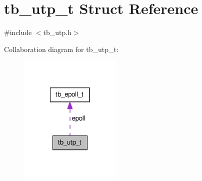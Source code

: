 \hypertarget{structtb__utp__t}{\section{tb\-\_\-utp\-\_\-t Struct Reference}
\label{structtb__utp__t}
}


{\ttfamily \#include $<$tb\-\_\-utp.\-h$>$}



Collaboration diagram for tb\-\_\-utp\-\_\-t\-:\nopagebreak
\begin{figure}[H]
\begin{center}
\leavevmode
\includegraphics[width=138pt]{structtb__utp__t__coll__graph}
\end{center}
\end{figure}
